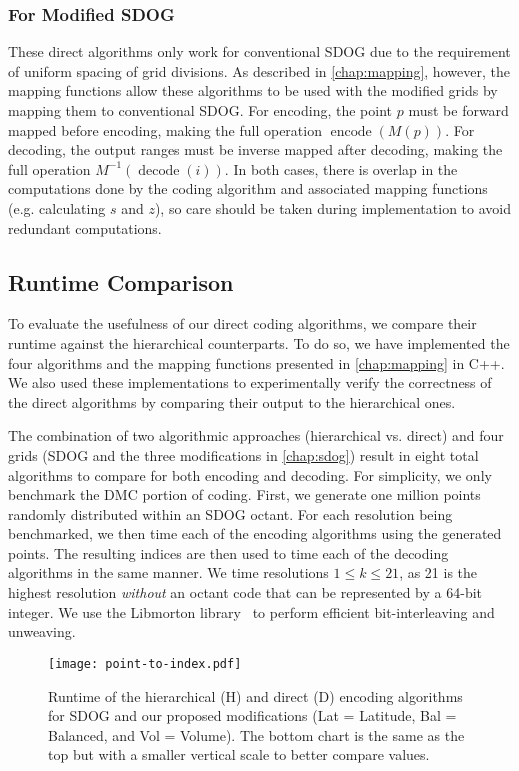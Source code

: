 \subsubsection{For Modified SDOG}
These direct algorithms only work for conventional SDOG due to the requirement of uniform spacing of grid divisions.
As described in \cref{chap:mapping}, however, the mapping functions allow these algorithms to be used with the modified grids by mapping them to conventional SDOG.
For encoding, the point $p$ must be forward mapped before encoding, making the full operation $\operatorname{encode}(M(p))$.
For decoding, the output ranges must be inverse mapped after decoding, making the full operation $M^{-1}(\operatorname{decode}(i))$.
In both cases, there is overlap in the computations done by the coding algorithm and associated mapping functions (e.g. calculating $s$ and $z$), so care should be taken during implementation to avoid redundant computations.


\subsection{Runtime Comparison} \label{chap:7:runtime}
To evaluate the usefulness of our direct coding algorithms, we compare their runtime against the hierarchical counterparts.
To do so, we have implemented the four algorithms and the mapping functions presented in \cref{chap:mapping} in C++.
We also used these implementations to experimentally verify the correctness of the direct algorithms by comparing their output to the hierarchical ones.


The combination of two algorithmic approaches (hierarchical vs. direct) and four grids (SDOG and the three modifications in \cref{chap:sdog}) result in eight total algorithms to compare for both encoding and decoding.
For simplicity, we only benchmark the DMC portion of coding.
First, we generate one million points randomly distributed within an SDOG octant.
For each resolution being benchmarked, we then time each of the encoding algorithms using the generated points.
The resulting indices are then used to time each of the decoding algorithms in the same manner.
We time resolutions $1 \le k \le 21$, as 21 is the highest resolution \textit{without} an octant code that can be represented by a 64-bit integer.
We use the Libmorton library~\cite{libmorton18} to perform efficient bit-interleaving and unweaving.


\begin{figure}[htp!]
	\centering
	\texttt{[image: point-to-index.pdf]}
	\caption[Runtime comparison of SDOG point encoding algorithms]{
		Runtime of the hierarchical (H) and direct (D) encoding algorithms for SDOG and our proposed modifications (Lat = Latitude, Bal = Balanced, and Vol = Volume).
		The bottom chart is the same as the top but with a smaller vertical scale to better compare values.
	}
	\label{fig:point-to-index}
\end{figure}


